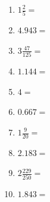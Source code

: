 \documentclass[12pt]{article}
\begin{document}
\begin{enumerate}
\newpage
\item \large $ 1 \frac{2}{5} = $ \vspace{1.5cm}
\item \large $ 4.943 = $ \vspace{1.5cm}
\item \large $ 3 \frac{47}{125} = $ \vspace{1.5cm}
\item \large $ 1.144 = $ \vspace{1.5cm}
\item \large $ 4 = $ \vspace{1.5cm}
\item \large $ 0.667 = $ \vspace{1.5cm}
\item \large $ 1 \frac{9}{20} = $ \vspace{1.5cm}
\item \large $ 2.183 = $ \vspace{1.5cm}
\item \large $ 2 \frac{229}{250} = $ \vspace{1.5cm}
\item \large $ 1.843 = $ \vspace{1.5cm}
\end{enumerate}\newpage
\end{document}
